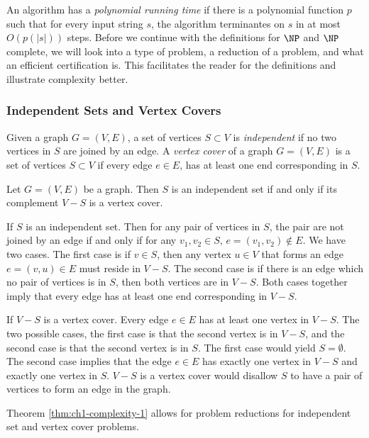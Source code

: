 An algorithm has a \textit{polynomial running time} if there is a polynomial function $p$ such that for every input string $s$, the algorithm terminantes on $s$ in at most $O\left( p \left( \left\vert s \right\vert\right)\right)$ steps.  Before we continue with the definitions for $\NP$ and $\NP$ complete, we will look into a type of problem, a reduction of a problem, and what an efficient certification is.  This facilitates the reader for the definitions and illustrate complexity better.
\subsubsection{Independent Sets and Vertex Covers}
Given a graph $G = (V,E)$, a set of vertices $S \subset V$ is \textit{independent} if no two vertices in $S$ are joined by an edge. A \textit{vertex cover} of a graph $G = (V,E)$  is a set of vertices $S \subset V$ if every edge $e \in E$, has at least one end corresponding in $S$.

\begin{thm}\label{thm:ch1-complexity-1}
Let $G = (V,E)$ be a graph.  Then $S$ is an independent set if and only if its complement $V-S$ is a vertex cover.
\end{thm}
\begin{pf}
If $S$ is an independent set. Then for any pair of vertices in $S$, the pair are not joined by an edge if and only if for any $v_1, v_2 \in S$, $e = \left( v_1, v_2 \right) \not \in E$.  We have two cases.  The first case is if $v \in S$, then any vertex $u \in V$ that forms an edge $e = (v,u) \in E$ must reside in $V-S$. The second case is if there is an edge which no pair of vertices is in $S$, then both vertices are in $V-S$.  Both cases together imply that every edge has at least one end corresponding in $V-S$. 


If $V-S$ is a vertex cover.  Every edge $e \in E$ has at least one vertex in $V-S$.  The two possible cases, the first case is that the second vertex is in $V-S$, and the second case is that the second vertex is in $S$.  The first case would yield $S = \emptyset$.  The second case implies that the edge $e \in E$ has exactly one vertex in $V-S$ and exactly one vertex in $S$.  $V-S$ is a vertex cover would disallow $S$ to have a pair of vertices to form an edge in the graph.
\end{pf}
Theorem \ref{thm:ch1-complexity-1} allows for problem reductions for independent set and vertex cover problems.
